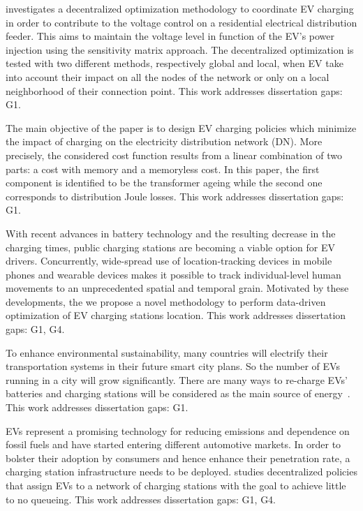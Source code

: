\documentclass[letterpaper, 12pt, oneside, doublespacing]{Thesis}
\begin{document}
\noindent \cite{introducing_decentralized_2015} investigates a decentralized optimization methodology to coordinate EV charging in order to contribute to the voltage control on a residential electrical distribution feeder. This aims to maintain the voltage level in function of the EV's power injection using the sensitivity matrix approach. The decentralized optimization is tested with two different methods, respectively global and local, when EV take into account their impact on all the nodes of the network or only on a local neighborhood of their connection point. This work addresses dissertation gaps: G1.



\noindent The main objective of the paper \cite{introducing_decentralized_2015} is to design EV charging policies which minimize the impact of charging on the electricity distribution network (DN). More precisely, the considered cost function results from a linear combination of two parts: a cost with memory and a memoryless cost. In this paper, the first component is identified to be the transformer ageing while the second one corresponds to distribution Joule losses. This work addresses dissertation gaps: G1.



\noindent With recent advances in battery technology and the resulting decrease in the charging times, public charging stations are becoming a viable option for EV drivers. Concurrently, wide-spread use of location-tracking devices in mobile phones and wearable devices makes it possible to track individual-level human movements to an unprecedented spatial and temporal grain. Motivated by these developments, the we \cite{optimizing_the_2015} propose a novel methodology to perform data-driven optimization of EV charging stations location. This work addresses dissertation gaps: G1, G4.



\noindent To enhance environmental sustainability, many countries will electrify their transportation systems in their future smart city plans. So the number of EVs running in a city will grow significantly. There are many ways to re-charge EVs' batteries and charging stations will be considered as the main source of energy~\cite{electric_vehicle_2013}. This work addresses dissertation gaps: G1.



\noindent EVs represent a promising technology for reducing emissions and dependence on fossil fuels and have started entering different automotive markets. In order to bolster their adoption by consumers and hence enhance their penetration rate, a charging station infrastructure needs to be deployed. \cite{socially_optimal_2013} studies decentralized policies that assign EVs to a network of charging stations with the goal to achieve little to no queueing. This work addresses dissertation gaps: G1, G4.
\end{document}
